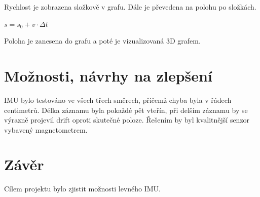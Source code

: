 \documentclass{article}
\begin{document}
Rychlost je zobrazena složkově v grafu. Dále je převedena na polohu po složkách.

\begin{center}
    \begin{math}
        s = s_{0} + v \cdot \Delta t
    \end{math}
\end{center}

Poloha je zanesena do grafu a poté je vizualizovaná 3D grafem.

\section{Možnosti, návrhy na zlepšení}

IMU bylo testováno ve všech třech směrech, přičemž chyba byla v řádech centimetrů. Délka záznamu byla pokaždé pět vteřín, při delším záznamu by se výrazně projevil drift oproti skutečné poloze. Řešením by byl kvalitnější senzor vybavený magnetometrem.

\section{Závěr}

Cílem projektu bylo zjistit možnosti levného IMU. 
\end{document}
